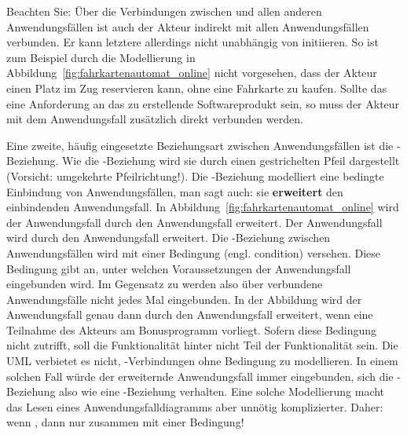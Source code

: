 Beachten Sie: Über die Verbindungen zwischen  und allen anderen Anwendungsfällen ist auch der Akteur  indirekt mit allen Anwendungs\-fällen verbunden. Er kann letztere allerdings nicht unabhängig von  
\linebreak %
 initiieren. So ist zum Beispiel durch die Modellierung in Abbildung~\ref{fig:fahrkartenautomat_online} nicht vorgesehen, dass der Akteur  einen Platz im Zug reservieren kann, ohne eine Fahrkarte zu kaufen. Sollte das eine Anforderung an das zu erstellende Software\-produkt sein, so muss der Akteur  mit dem Anwendungsfall   zusätzlich direkt verbunden werden.

\vspace{1mm} %

Eine zweite, häufig eingesetzte Beziehungsart zwischen Anwendungsfällen ist die -Beziehung.
Wie die -Beziehung wird sie durch einen gestrichelten Pfeil dargestellt (Vorsicht: umgekehrte Pfeilrichtung!). Die -Beziehung modelliert eine bedingte Einbindung von Anwendungsfällen, man sagt auch: sie \textbf{erweitert} den einbindenden Anwendungsfall. In Abbildung~\ref{fig:fahrkartenautomat_online} wird der Anwendungs\-fall  durch den Anwendungsfall  erweitert. Der Anwendungsfall   wird durch den Anwendungsfall   erweitert. Die -Beziehung zwischen Anwendungsfällen wird mit einer Bedingung (engl. condition) versehen. Diese Bedingung gibt an, unter welchen Voraussetzungen der Anwendungsfall eingebunden wird. Im Gegensatz zu  werden also über  verbundene Anwendungsfälle nicht jedes Mal eingebunden. In der Abbildung wird der Anwendungsfall  genau dann durch den Anwendungsfall  erweitert, wenn eine Teilnahme des Akteurs am Bonusprogramm vorliegt. Sofern diese Bedingung nicht zutrifft, soll die Funktionalität hinter  nicht Teil der Funktionalität  sein. Die UML verbietet es nicht, -Verbindungen ohne Bedingung zu modellieren. In einem solchen Fall würde der erweiternde Anwendungs\-fall immer eingebunden, sich die -Beziehung also wie eine -Beziehung verhalten. Eine solche Modellierung macht das Lesen eines Anwendungsfalldiagramms aber unnötig komplizierter. Daher: wenn , dann nur zusammen mit einer Bedingung!

